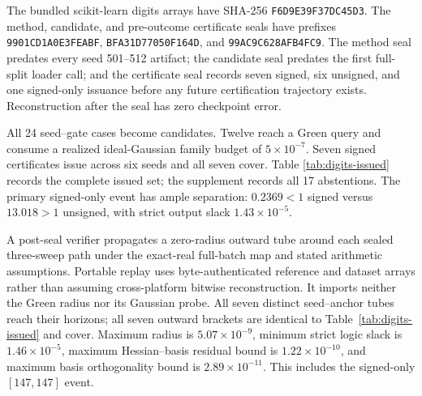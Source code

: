 \documentclass{article}
\begin{document}
The bundled scikit-learn digits arrays have SHA-256
\texttt{F6D9E39F37DC45D3}.  The method, candidate, and pre-outcome certificate
seals have prefixes \texttt{9901CD1A0E3FEABF},
\texttt{BFA31D77050F164D}, and \texttt{99AC9C628AFB4FC9}.
The method seal predates every seed 501--512 artifact; the candidate seal
predates the first full-split loader call; and the certificate seal records
seven signed, six unsigned, and one signed-only issuance before any future
certification trajectory exists.  Reconstruction after the seal has zero
checkpoint error.

All 24 seed--gate cases become candidates.  Twelve reach a Green query and
consume a realized ideal-Gaussian family budget of $5\times10^{-7}$.  Seven
signed certificates issue across six seeds and all seven cover.  Table
\ref{tab:digits-issued} records the complete issued set; the supplement records
all 17 abstentions.  The primary signed-only event has ample separation:
$0.2369<1$ signed versus $13.018>1$ unsigned, with strict output slack
$1.43\times10^{-5}$.

A post-seal verifier propagates a zero-radius outward tube around each sealed
three-sweep path under the exact-real full-batch map and stated arithmetic
assumptions.  Portable replay uses byte-authenticated reference and dataset
arrays rather than assuming cross-platform bitwise reconstruction.  It imports
neither the Green radius nor its Gaussian probe.  All seven distinct
seed--anchor tubes reach their horizons; all seven outward brackets are
identical to Table~\ref{tab:digits-issued} and cover.  Maximum radius is
$5.07\times10^{-9}$, minimum strict logic slack is $1.46\times10^{-5}$,
maximum Hessian--basis residual bound is $1.22\times10^{-10}$, and maximum
basis orthogonality bound is $2.89\times10^{-11}$.  This includes the
signed-only $[147,147]$ event.
\end{document}
